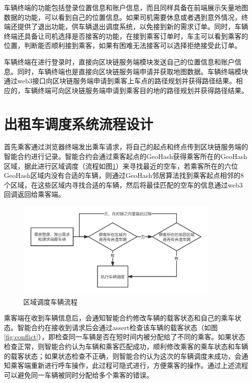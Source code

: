 车辆终端的功能包括登录位置信息和账户信息，而且同样具备在前端展示矢量地图数据的功能，可以看到自己的位置信息。如果司机需要休息或者遇到意外情况，终端还提供了退出功能，供车辆退出调度系统，以免接到新的需求订单。同时，车辆终端还具备让司机选择是否接客的功能，在接到乘客订单时，车主可以看到乘客的位置，判断能否顺利接到乘客，如果有困难无法接客可以选择拒绝接受此订单。

车辆终端在进行登录时，直接向区块链服务端模块发送自己的位置信息和账户信息。同时，车辆终端也是直接向区块链服务端申请并获取地图数据。车辆终端模块通过web3接口向区块链服务端申请到乘客上车点的路径规划并获得路径结果。相应的，车辆终端可向区块链服务端申请到乘客目的地的路径规划并获得路径结果。

\section{出租车调度系统流程设计}
首先乘客通过浏览器终端发出乘车请求，将自己的起点和终点传到区块链服务端的智能合约进行记录。智能合约会通过乘客起点的GeoHash获得乘客所在的GeoHash区域，据此进行区域调度（流程如图\ref{fig:region}）来寻找最近的空车，若乘客所在的六位GeoHash区域内没有合适的车辆，则通过GeoHash邻居算法找到乘客起点相邻的8个区域，在这些区域内寻找合适的车辆，然后将最佳匹配的空车的信息通过web3回调返回给乘客端。

\begin{figure}[h]
  \centering
  \includegraphics[width=0.9\textwidth]{figures/区域调度车辆流程}
  \caption{区域调度车辆流程}\label{fig:region}
\end{figure}

乘客端在收到车辆信息后，会通知智能合约修改车辆的载客状态和自己的乘车状态。智能合约在接收到请求后会通过assert检查该车辆的载客状态（如图\ref{fig:conflict}），即检查同一车辆是否在短时间内被分配给了不同的乘客。如果状态检查正常，则智能合约认为车辆和乘客匹配成功，顺利修改乘客的乘车状态和车辆的载客状态；如果状态检查不正确，则智能合约认为这次的车辆调度未成功，会通知乘客端重新进行呼车操作，此过程可隐式进行，方便乘客的操作。通过上述流程可以避免同一车辆被同时分配给多个乘客的错误。

